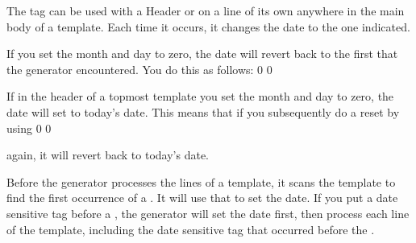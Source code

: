 \documentclass[]{memoir}
\begin{document}
\begin{boxed}
The tag  can be used with a Header or on a line of its own anywhere in the main body of a template. Each time it occurs, it changes the date to the one indicated.
\end{boxed}

\begin{boxed}
If you set the month and day to zero, the date will revert back to the first  that the generator encountered. You do this as follows: 
 0
 0

\end{boxed}

\begin{boxed}
If in the header of a topmost template you set the month and day to zero, the date will set to today's date.  This means that if you subsequently do a reset by using  
 0
 0
\end{boxed}
 again, it will revert back to today's date.

\begin{warning}
Before the generator processes the lines of a template, it scans the template to find the first occurrence of a .  It will use that to set the date.  If you put a date sensitive tag before a , the generator will set the date first, then process each line of the template, including the date sensitive tag that occurred before the .
\end{warning}

\vfill



\fancyhead[L]{\textsf{\rightmark}} %
\fancyhead[R]{\textsf{\leftmark}} %
\renewcommand{\headrulewidth}{1.4pt} %
\fancyfoot[C]{\textbf{\textsf{\thepage}}} %
\renewcommand{\footrulewidth}{1.4pt} %
\pagestyle{fancy} %

\newcommand{\entry}[4]{\markboth{#1}{#1}\textbf{#1}\ {(#2)}\ \textit{#3}\ $\bullet$\ {#4}}  %
\end{document}
